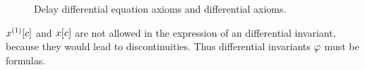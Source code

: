 \begin{figure}[t]
\begin{calculuscollections}{\coloumnwidth}
\begin{calculus}
            \end{calculus}
            \end{calculuscollections}
            \caption{Delay differential equation axioms and differential axioms.}
            \label{fig:D-axioms}
        \end{figure}

        $\Dx[c]$ and $x[c]$ are not allowed in the expression of an differential invariant, because they would lead to discontinuities. Thus differential invariants $\varphi$ must be \FOLR formulas.


